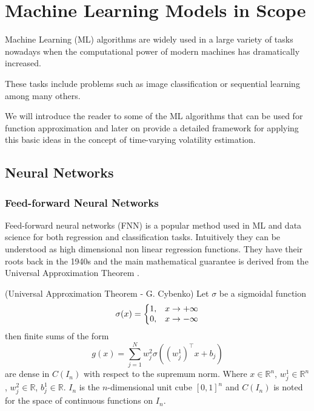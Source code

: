 \documentclass[a4paper, oneside]{discothesis}
\begin{document}
  \begin{mdframed}\begin{remark}
\end{remark}\end{mdframed}  

\chapter{Machine Learning Models in Scope}

Machine Learning (ML) algorithms are widely used in a large variety of tasks nowadays when the computational power of modern machines has dramatically increased. 

These tasks include problems such as image classification \cite{imageNet} or sequential learning  \cite{https://doi.org/10.48550/arxiv.1706.03762} among many others.

We will introduce the reader to some of the ML algorithms that can be used for function approximation and later on provide a detailed framework for applying this basic ideas in the concept of time-varying volatility estimation.  

\section{Neural Networks}
\subsection{Feed-forward Neural Networks}\label{FNN}

Feed-forward neural networks (FNN) is a popular method used in ML and data science for both regression and classification tasks. Intuitively they can be understood as high dimensional non linear regression functions. They have their roots back in the 1940s and the main mathematical guarantee is derived from the Universal Approximation Theorem \cite{Cybenko1989ApproximationBS}. 

\theorem (Universal Approximation Theorem - G. Cybenko) Let $\sigma$ be a sigmoidal function 
\begin{equation}
\sigma(x) = \left\{ \begin{array}{@{}ll@{}}
    1, &  x\rightarrow+\infty  \\
    0, & x\rightarrow-\infty
\end{array}\right.
\end{equation}
then finite sums of the form 
\begin{equation}
g(x) = \sum_{j=1}^{N} w_j^2\sigma((w^1_j)^\intercal x+b_j)
\end{equation}
are dense in $C(I_n)$ with respect to the supremum norm. Where $x\in \mathbb{R}^n$, $w_j^1\in  \mathbb{R}^n$, $w_j^2\in \mathbb{R}$, $b_j^1\in \mathbb{R}$. $I_n$ is the $n$-dimensional unit cube $[0,1]^n$ and $C(I_n)$ is noted for the space of continuous functions on $I_n$.
\end{document}
